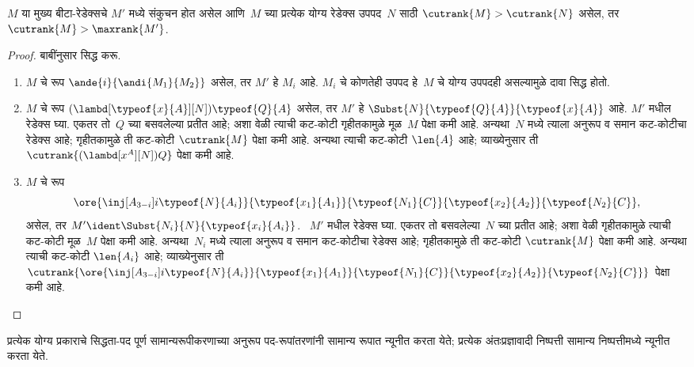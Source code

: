 \begin{lem}
  $M$ या मुख्य बीटा-रेडेक्सचे $M'$ मध्ये संकुचन होत असेल आणि~$M$ च्या प्रत्येक
  योग्य रेडेक्स उपपद~$N$ साठी
  $\cutrank{M} > \cutrank{N}$ असेल, तर
  $\cutrank{M} > \maxrank{M'}$.
\end{lem}

\begin{proof}
  बाबींनुसार सिद्ध करू.
  \begin{enumerate}
  \item $M$ चे रूप $\ande{i}{\andi{M_1}{M_2}}$ असेल, तर
    $M'$ हे $M_i$ आहे. $M_i$ चे कोणतेही उपपद हे~$M$ चे
    योग्य उपपदही असल्यामुळे दावा सिद्ध होतो.
  \item $M$ चे रूप
    $(\lambd[\typeof{x}{A}][N])\typeof{Q}{A}$ असेल,
    तर $M'$ हे $\Subst{N}{\typeof{Q}{A}}{\typeof{x}{A}}$
    आहे. $M'$ मधील रेडेक्स घ्या. एकतर तो~$Q$ च्या बसवलेल्या प्रतीत आहे; अशा वेळी
    त्याची कट-कोटी गृहीतकामुळे मूळ~$M$ पेक्षा कमी आहे.
    अन्यथा~$N$ मध्ये त्याला
    अनुरूप व समान कट-कोटीचा रेडेक्स आहे; गृहीतकामुळे ती
    कट-कोटी $\cutrank{M}$ पेक्षा कमी आहे. अन्यथा त्याची
    कट-कोटी $\len{A}$ आहे; व्याख्येनुसार ती
    $\cutrank{(\lambd[x^{A}][N])Q}$ पेक्षा कमी आहे.
  \item $M$ चे रूप
    \[
    \ore{\inj[A_{3-i}]{i}{\typeof{N}{A_i}}}
        {\typeof{x_1}{A_1}}{\typeof{N_1}{C}}
        {\typeof{x_2}{A_2}}{\typeof{N_2}{C}},
    \]
    असेल, तर $M' \ident \Subst{N_i}{N}{\typeof{x_i}{A_i}}$.
    ~$M'$ मधील रेडेक्स घ्या. एकतर तो बसवलेल्या~$N$ च्या प्रतीत आहे; अशा वेळी
    गृहीतकामुळे त्याची कट-कोटी मूळ~$M$ पेक्षा कमी आहे.
    अन्यथा~$N_i$ मध्ये त्याला
    अनुरूप व समान कट-कोटीचा रेडेक्स आहे; गृहीतकामुळे ती
    कट-कोटी $\cutrank{M}$ पेक्षा कमी आहे. अन्यथा त्याची
    कट-कोटी $\len{A_i}$ आहे; व्याख्येनुसार ती
    $\cutrank{\ore{\inj[A_{3-i}]{i}{\typeof{N}{A_i}}}
      {\typeof{x_1}{A_1}}{\typeof{N_1}{C}}
      {\typeof{x_2}{A_2}}{\typeof{N_2}{C}}}$ पेक्षा कमी आहे.
  \end{enumerate}
\end{proof}

\begin{thm}
  प्रत्येक योग्य प्रकाराचे सिद्धता-पद पूर्ण सामान्यरूपीकरणाच्या
  अनुरूप पद-रूपांतरणांनी सामान्य रूपात न्यूनीत करता येते;
  प्रत्येक अंतःप्रज्ञावादी निष्पत्ती सामान्य निष्पत्तीमध्ये न्यूनीत करता येते.
\end{thm}

